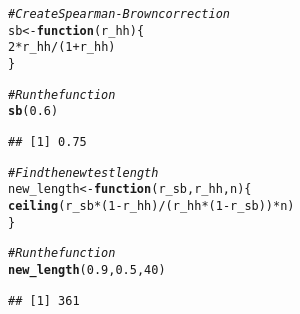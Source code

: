 \documentclass[dvipsnames]{beamer}\usepackage[]{graphicx}\usepackage[]{color}
\makeatletter
\newcommand{\hlnum}[1]{\textcolor[rgb]{0.686,0.059,0.569}{#1}}%
\newcommand{\hlcom}[1]{\textcolor[rgb]{0.678,0.584,0.686}{\textit{#1}}}%
\newcommand{\hlopt}[1]{\textcolor[rgb]{0,0,0}{#1}}%
\newcommand{\hlstd}[1]{\textcolor[rgb]{0.345,0.345,0.345}{#1}}%
\newcommand{\hlkwa}[1]{\textcolor[rgb]{0.161,0.373,0.58}{\textbf{#1}}}%
\newcommand{\hlkwb}[1]{\textcolor[rgb]{0.69,0.353,0.396}{#1}}%
\newcommand{\hlkwc}[1]{\textcolor[rgb]{0.333,0.667,0.333}{#1}}%
\newcommand{\hlkwd}[1]{\textcolor[rgb]{0.737,0.353,0.396}{\textbf{#1}}}%
\newenvironment{kframe}{%
 \def\at@end@of@kframe{}%
 \ifinner\ifhmode%
  \def\at@end@of@kframe{\end{minipage}}%
  \begin{minipage}{\columnwidth}%
 \fi\fi%
 \def\FrameCommand##1{\hskip\@totalleftmargin \hskip-\fboxsep
 \colorbox{shadecolor}{##1}\hskip-\fboxsep
     \hskip-\linewidth \hskip-\@totalleftmargin \hskip\columnwidth}%
 \MakeFramed {\advance\hsize-\width
   \@totalleftmargin\z@ \linewidth\hsize
   \@setminipage}}%
 {\par\unskip\endMakeFramed%
 \at@end@of@kframe}
\newenvironment{knitrout}{}{} %
\makeatother
\begin{document}
\begin{frame}[fragile]

\begin{knitrout}
\color{fgcolor}\begin{kframe}
\begin{alltt}
\hlcom{# Create Spearman-Brown correction}
\hlstd{sb} \hlkwb{<-} \hlkwa{function}\hlstd{(}\hlkwc{r_hh}\hlstd{)\{}
  \hlnum{2} \hlopt{*} \hlstd{r_hh} \hlopt{/} \hlstd{(}\hlnum{1} \hlopt{+} \hlstd{r_hh)}
\hlstd{\}}

\hlcom{# Run the function}
\hlkwd{sb}\hlstd{(}\hlnum{0.6}\hlstd{)}
\end{alltt}
\begin{verbatim}
## [1] 0.75
\end{verbatim}
\begin{alltt}
\hlcom{# Find the new test length}
\hlstd{new_length} \hlkwb{<-} \hlkwa{function}\hlstd{(}\hlkwc{r_sb}\hlstd{,} \hlkwc{r_hh}\hlstd{,} \hlkwc{n}\hlstd{)\{}
  \hlkwd{ceiling}\hlstd{(r_sb} \hlopt{*} \hlstd{(}\hlnum{1} \hlopt{-} \hlstd{r_hh)} \hlopt{/} \hlstd{(r_hh} \hlopt{*} \hlstd{(}\hlnum{1} \hlopt{-} \hlstd{r_sb))} \hlopt{*} \hlstd{n)}
\hlstd{\}}

\hlcom{# Run the function}
\hlkwd{new_length}\hlstd{(}\hlnum{0.9}\hlstd{,} \hlnum{0.5}\hlstd{,} \hlnum{40}\hlstd{)}
\end{alltt}
\begin{verbatim}
## [1] 361
\end{verbatim}
\end{kframe}
\end{knitrout}
\end{frame}
\end{document}
